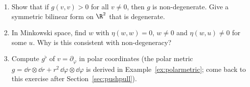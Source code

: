 \begin{exercises}
\begin{enumerate}[nosep]
\item Show that if $g(v,v)>0$ for all $v\neq0$, then $g$ is non-degenerate. Give a symmetric bilinear form on $\R^2$ that is degenerate.
\item In Minkowski space, find $w$ with $\eta(w,w)=0$, $w\ne0$ and $\eta(w,u)\neq0$ for some $u$. Why is this consistent with non-degeneracy?
\item Compute $g^\flat$ of $v=\partial_\varphi$ in polar coordinates (the polar metric $g=\dd r\otimes\dd r+r^2\,\dd\varphi\otimes\dd\varphi$ is derived in Example~\ref{ex:polarmetric}; come back to this exercise after Section~\ref{sec:pushpull}).
\end{enumerate}
\end{exercises}
